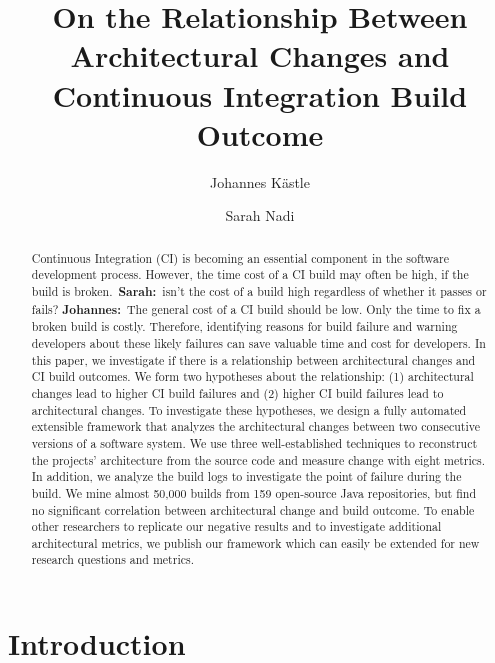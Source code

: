 \documentclass[sigplan, anonymous, review]{acmart}
\newcommand{\sn}[1]{{\color{blue}\textbf{Sarah:}~#1}}
\newcommand{\jk}[1]{{\color{violet}\textbf{Johannes:}~#1}}
\begin{document}
\title[Architectural Change vs CI Build Outcome]{On the Relationship Between Architectural Changes and Continuous Integration Build Outcome
}

\author{Johannes K{\"a}stle}

\author{Sarah Nadi}

\begin{abstract}
Continuous Integration (CI) is becoming an essential component in the software development process.
However, the time cost of a CI build may often be high, if the build is broken.~\sn{isn't the cost of a build high regardless of whether it passes or fails?} \jk{The general cost of a CI build should be low. Only the time to fix a broken build is costly.}
Therefore, identifying reasons for build failure and warning developers about these likely failures can save valuable time and cost for developers.
In this paper, we investigate if there is a relationship between architectural changes and CI build outcomes.
We form two hypotheses about the relationship: (1) architectural changes lead to higher CI build failures and (2) higher CI build failures lead to architectural changes.
To investigate these hypotheses, we design a fully automated extensible framework that analyzes the architectural changes between two consecutive versions of a software system.
We use three well-established techniques to reconstruct the projects' architecture from the source code and measure change with eight metrics. 
In addition, we analyze the build logs to investigate the point of failure during the build. 
We mine almost 50,000 builds from 159 open-source Java repositories, but find no significant correlation between architectural change and build outcome. 
To enable other researchers to replicate our negative results and to investigate additional architectural metrics, we publish our framework which can easily be extended for new research questions and metrics.
\end{abstract}

\maketitle

\section{Introduction}
\end{document}
